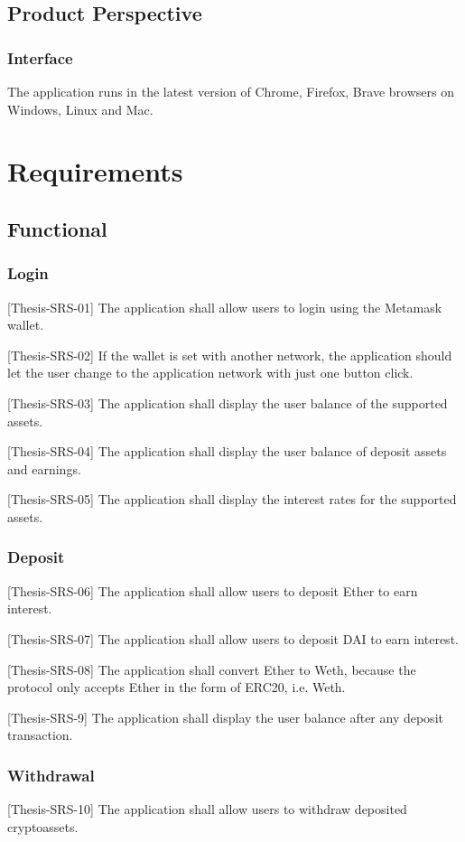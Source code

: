 \documentclass[11pt,a4paper]{report}
\begin{document}
\subsection{Product Perspective}
\subsubsection{Interface}
The application runs in the latest version of Chrome, Firefox, Brave browsers on Windows, Linux and Mac.

\section{Requirements}
\subsection{Functional}
\subsubsection{Login}
[Thesis-SRS-01] The application shall allow users to login using the Metamask\cite{wiki:MetaMask} wallet.

[Thesis-SRS-02]  If the wallet is set with another network, the application should let the user change to the application network with just one button click.

[Thesis-SRS-03] The application shall display the user balance of the supported assets.

[Thesis-SRS-04] The application shall display the user balance of deposit assets and earnings.

[Thesis-SRS-05] The application shall display the interest rates for the supported assets.
\subsubsection{Deposit}
[Thesis-SRS-06] The application shall allow users to deposit Ether to earn interest.

[Thesis-SRS-07] The application shall allow users to deposit DAI to earn interest.

[Thesis-SRS-08] The application shall convert Ether to Weth, because the protocol only accepts Ether in the form of ERC20, i.e. Weth.

[Thesis-SRS-9] The application shall display the user balance after any deposit transaction.

\subsubsection{Withdrawal}
[Thesis-SRS-10] The application shall allow users to withdraw deposited cryptoassets.
\end{document}
